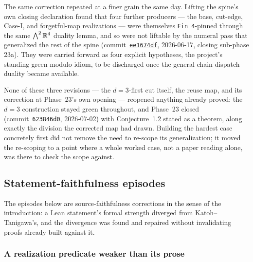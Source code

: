 The same correction repeated at a finer grain the same day. Lifting the
spine's own closing declaration found that four further producers ---
the base, cut-edge, Case-I, and forgetful-map realizations --- were
themselves \texttt{Fin 4}-pinned through the same $\bigwedge^2{\mathbb{R}}^4$
duality lemma, and so were not liftable by the numeral pass that
generalized the rest of the spine
(commit~\href{https://github.com/bryangingechen/CombinatorialRigidity/commit/ee1674dfef3789d3fe9d71415be1626e3d2d51e6}{\texttt{ee1674df}},
2026-06-17, closing sub-phase 23a). They were carried forward as four
explicit hypotheses, the project's standing green-modulo idiom, to be
discharged once the general chain-dispatch duality became available.

None of these three revisions --- the $d = 3$-first cut itself, the
reuse map, and its correction at Phase~23's own opening --- reopened
anything already proved: the $d = 3$ construction stayed green
throughout, and Phase~23 closed
(commit~\href{https://github.com/bryangingechen/CombinatorialRigidity/commit/623846d0f6d545035812d1c6159da4fea309febe}{\texttt{623846d0}},
2026-07-02) with Conjecture~1.2 stated as a theorem, along exactly the
division the corrected map had drawn. Building the hardest case
concretely first did not remove the need to re-scope its
generalization; it moved the re-scoping to a point where a whole worked
case, not a paper reading alone, was there to check the scope against.

\subsection{Statement-faithfulness episodes}
\label{sec:formalization-notes-statement-faithfulness}

The episodes below are source-faithfulness corrections in the sense of
the introduction: a Lean statement's formal strength diverged from
Katoh--Tanigawa's, and the divergence was found and repaired without
invalidating proofs already built against it.

\subsubsection{A realization predicate weaker than its prose}


